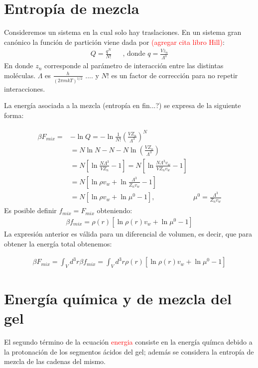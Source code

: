 
\section{Entrop\'ia de mezcla}
Consideremos un sistema en la cual solo hay traslaciones.
En un sistema gran can\'onico la funci\'on de partici\'on viene dada por \textcolor{red}{(agregar cita libro Hill)}:
\begin{align}
	Q=\frac{q^N}{N !} && \text{, donde $q=\frac{Vz_n}{\Lambda^3}$} 
\end{align}
En donde $z_n$ corresponde al par\'ametro de  interacci\'on entre las distintas mol\'eculas. $\Lambda$ es $\frac{h}{(2\pi mkT)^{1/2}}$ .... y  $N!$  es un factor de correcci\'on para no repetir interacciones.

La energ\'ia asociada a la mezcla (entrop\'ia en fin...?) se expresa de la siguiente forma:

\begin{align}
	\begin{aligned}
		\beta F_{mix}=&-\ln Q =-\ln\frac{1}{N!}\left(\frac{VZ_n}{\Lambda^3}\right)^N \\
		&= N\ln N -N -N\ln\left(\frac{VZ_n}{\Lambda^3}\right) \\
		&=N\left[\ln\frac{N\Lambda^3}{VZ_n} -1\right]= N\left[\ln\frac{N\Lambda^3v_w}{VZ_nv_w} -1\right] \\
		&=N\left[\ln\rho v_w + \ln\frac{\Lambda^3}{Z_nv_w} -1\right] \\
		&=N\left[\ln\rho v_w + \ln\mu^0 -1\right], & \mu^0=\frac{\Lambda^3}{Z_nv_w}
	\end{aligned}
\end{align}
Es posible definir $f_{mix}=F_{mix}$ obteniendo: 
\begin{align}
	\beta f_{mix}=\rho(r)\left[\ln\rho(r) v_w + \ln\mu^0 -1\right] 
\end{align}
La expresi\'on anterior es v\'alida para un diferencial de volumen, es decir, que para obtener la energ\'ia total obtenemos:

\begin{align}
	\beta F_{mix}=\int_V{d^3r\beta f_{mix}}=\int_V{d^3r\rho(r)\left[\ln\rho(r) v_w + \ln\mu^0 -1\right]} 
\end{align}


\section{Energ\'ia qu\'imica y de mezcla del gel}

El segundo t\'ermino de la ecuaci\'on \textcolor{red}{energia} consiste en la energ\'ia qu\'imca debido a la protonaci\'on de los segmentos \'acidos del gel; adem\'as se considera la entrop\'ia de mezcla de las cadenas del mismo.

